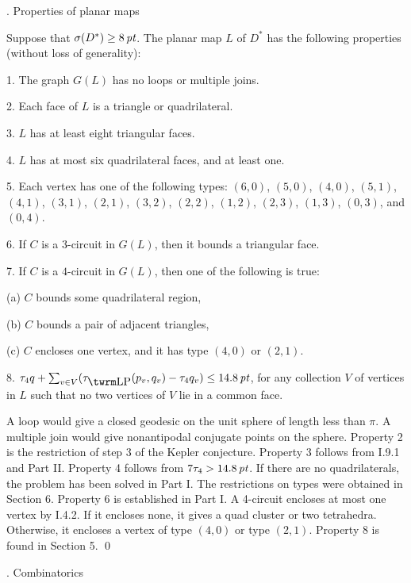 . Properties of planar maps\endhead

Suppose that 
$\sigma(D^*)\ge 8\,\hbox{\it pt}$.
The planar map $L$ of $D^*$ has the following properties
	(without loss of generality):
\endproclaim

1.  The graph $G(L)$ has no loops or multiple joins.

2.  Each face of $L$ is a triangle or quadrilateral.

3.  $L$ has at least eight triangular faces.

4.  $L$ has at most six quadrilateral faces, and at least one.

5.  Each vertex has one of the following types: 
	$(6,0)$, $(5,0)$, $(4,0)$, $(5,1)$, $(4,1)$, $(3,1)$, $(2,1)$,
		$(3,2)$, $(2,2)$, $(1,2)$, $(2,3)$, $(1,3)$, $(0,3)$, and
		$(0,4)$.

6.  If $C$ is a $3$-circuit in $G(L)$, then it bounds a triangular
	face.

7.  If $C$ is a $4$-circuit in $G(L)$, then one of the following is
	true:

	\quad (a) $C$ bounds some quadrilateral region,

	\quad (b) $C$ bounds a pair of adjacent triangles,
	
	\quad (c) $C$ encloses one vertex, and it has type $(4,0)$ or $(2,1)$.

8.  $\tau_4 q + \sum_{v\in V} (\tlp(p_v,q_v)-\tau_4q_v) \le 14.8\,\pt$, 
	for any collection $V$ of vertices
	in $L$ such that no two vertices of $V$ lie in
	a common face.

  A loop would give a closed geodesic on the
unit sphere of length less than $\pi$.  A multiple join
would give nonantipodal conjugate points on the sphere.
Property 2 is
the restriction of step 3 of the Kepler conjecture.
Property 3 follows from I.9.1 and Part II.  Property 4 
follows from $7\tau_4>14.8\,\hbox{\it pt}$.
If there are no quadrilaterals,
the problem has been solved in Part I.  The restrictions
on types were obtained in Section 6.  Property 6 is
established in Part I.  A 4-circuit encloses at most one
vertex by I.4.2.  If it encloses none, it gives  a quad
cluster or two tetrahedra.  Otherwise, it encloses a
vertex of type $(4,0)$ or type $(2,1)$.  Property
8 is found in Section 5.
\qed\enddemo






. Combinatorics\endhead

